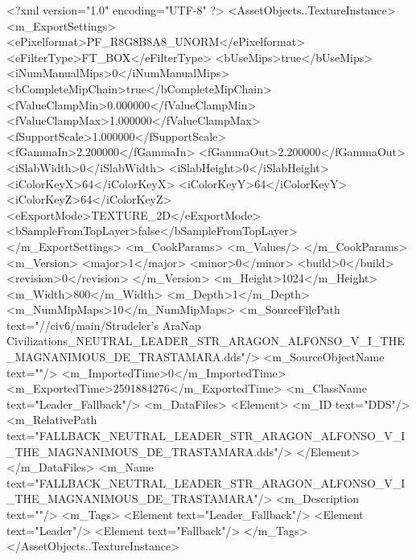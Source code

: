 <?xml version="1.0" encoding="UTF-8" ?>
<AssetObjects..TextureInstance>
	<m_ExportSettings>
		<ePixelformat>PF_R8G8B8A8_UNORM</ePixelformat>
		<eFilterType>FT_BOX</eFilterType>
		<bUseMips>true</bUseMips>
		<iNumManualMips>0</iNumManualMips>
		<bCompleteMipChain>true</bCompleteMipChain>
		<fValueClampMin>0.000000</fValueClampMin>
		<fValueClampMax>1.000000</fValueClampMax>
		<fSupportScale>1.000000</fSupportScale>
		<fGammaIn>2.200000</fGammaIn>
		<fGammaOut>2.200000</fGammaOut>
		<iSlabWidth>0</iSlabWidth>
		<iSlabHeight>0</iSlabHeight>
		<iColorKeyX>64</iColorKeyX>
		<iColorKeyY>64</iColorKeyY>
		<iColorKeyZ>64</iColorKeyZ>
		<eExportMode>TEXTURE_2D</eExportMode>
		<bSampleFromTopLayer>false</bSampleFromTopLayer>
	</m_ExportSettings>
	<m_CookParams>
		<m_Values/>
	</m_CookParams>
	<m_Version>
		<major>1</major>
		<minor>0</minor>
		<build>0</build>
		<revision>0</revision>
	</m_Version>
	<m_Height>1024</m_Height>
	<m_Width>800</m_Width>
	<m_Depth>1</m_Depth>
	<m_NumMipMaps>10</m_NumMipMaps>
	<m_SourceFilePath text="//civ6/main/Strudeler's AraNap Civilizations\ArtFiles\FALLBACK_NEUTRAL_LEADER_STR_ARAGON_ALFONSO_V_I_THE_MAGNANIMOUS_DE_TRASTAMARA.dds"/>
	<m_SourceObjectName text=""/>
	<m_ImportedTime>0</m_ImportedTime>
	<m_ExportedTime>2591884276</m_ExportedTime>
	<m_ClassName text="Leader_Fallback"/>
	<m_DataFiles>
		<Element>
			<m_ID text="DDS"/>
			<m_RelativePath text="FALLBACK_NEUTRAL_LEADER_STR_ARAGON_ALFONSO_V_I_THE_MAGNANIMOUS_DE_TRASTAMARA.dds"/>
		</Element>
	</m_DataFiles>
	<m_Name text="FALLBACK_NEUTRAL_LEADER_STR_ARAGON_ALFONSO_V_I_THE_MAGNANIMOUS_DE_TRASTAMARA"/>
	<m_Description text=""/>
	<m_Tags>
		<Element text="Leader_Fallback"/>
		<Element text="Leader"/>
		<Element text="Fallback"/>
	</m_Tags>
</AssetObjects..TextureInstance>

